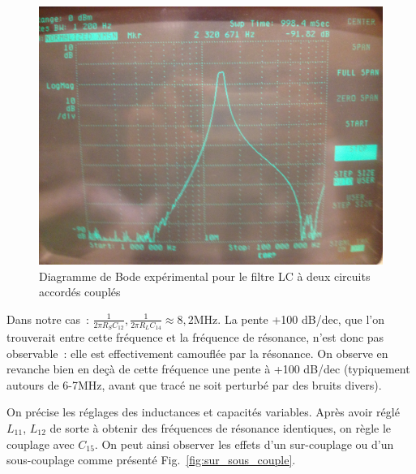 \documentclass{article}
\begin{document}
\begin{figure}[h]
	\centering
	\includegraphics[width=.5\textwidth]{1MHz_100MHz}
	\caption{Diagramme de Bode expérimental pour le filtre LC à deux circuits accordés couplés}
	\label{fig:LC2plot}
\end{figure}

Dans notre cas~: ${\frac{1}{2\pi R_S C_{12}}, \frac{1}{2\pi R_L C_{14}}\approx 8,2\mathrm{MHz}}$. La pente +100 dB/dec, que l'on trouverait entre cette fréquence et la fréquence de résonance, n'est donc pas observable~: elle est effectivement camouflée par la résonance. On observe en revanche bien en deçà de cette fréquence une pente à +100 dB/dec (typiquement autours de 6-7MHz, avant que tracé ne soit perturbé par des bruits divers).



On précise les réglages des inductances et capacités variables. Après avoir réglé $L_{11}$, $L_{12}$ de sorte à obtenir des fréquences de résonance identiques, on règle le couplage avec $C_{15}$. On peut ainsi observer les effets d'un sur-couplage ou d'un sous-couplage comme présenté Fig.~\ref{fig:sur_sous_couple}.
\end{document}
